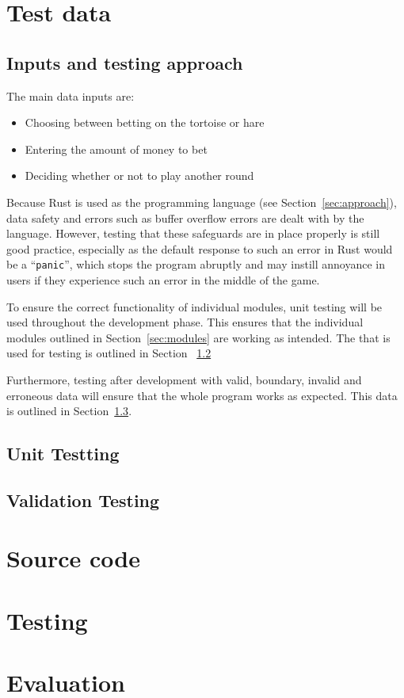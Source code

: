 \documentclass[11pt]{article}
\begin{document}
    \section{Test data}
    \subsection{Inputs and testing approach}
    The main data inputs are:
    \begin{itemize}
        \item Choosing between betting on the tortoise or hare
        \item Entering the amount of money to bet
        \item Deciding whether or not to play another round
    \end{itemize}

    Because Rust is used as the programming language (see Section~\ref{sec:approach}), data safety
    and errors such as buffer overflow errors are dealt with by the language. However, testing that
    these safeguards are in place properly is still good practice, especially as the default response
    to such an error in Rust would be a ``\texttt{panic}'', which stops the program abruptly and may
    instill annoyance in users if they experience such an error in the middle of the game.

    To ensure the correct functionality of individual modules, unit testing will be used throughout
    the development phase. This ensures that the individual modules outlined in Section~\ref{sec:modules}
    are working as intended. The that is used for testing is outlined in Section ~\ref{sec:unit-test}

    Furthermore, testing after development with valid, boundary, invalid and erroneous data will ensure
    that the whole program works as expected. This data is outlined in Section~\ref{sec:whole-test}.
    \subsection{Unit Testting}
    \label{sec:unit-test}
    \subsection{Validation Testing}
    \label{sec:whole-test}
    \section{Source code}
    \section{Testing}
    \section{Evaluation}
\end{document}
